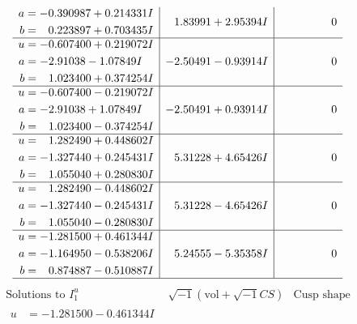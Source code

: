 \documentclass[1p]{elsarticle_modified}
\theoremstyle{definition}
\newcommand{\I}{\sqrt{-1}}
\begin{document}
$$\begin{array}{c|c|c}
\begin{aligned}
a &= -0.390987 + 0.214331 I \\
b &= \phantom{-}0.223897 + 0.703435 I\end{aligned}
 & \phantom{-}1.83991 + 2.95394 I & \phantom{-0.000000 } 0 \\ \hline\begin{aligned}
u &= -0.607400 + 0.219072 I \\
a &= -2.91038 - 1.07849 I \\
b &= \phantom{-}1.023400 + 0.374254 I\end{aligned}
 & -2.50491 - 0.93914 I & \phantom{-0.000000 } 0 \\ \hline\begin{aligned}
u &= -0.607400 - 0.219072 I \\
a &= -2.91038 + 1.07849 I \\
b &= \phantom{-}1.023400 - 0.374254 I\end{aligned}
 & -2.50491 + 0.93914 I & \phantom{-0.000000 } 0 \\ \hline\begin{aligned}
u &= \phantom{-}1.282490 + 0.448602 I \\
a &= -1.327440 + 0.245431 I \\
b &= \phantom{-}1.055040 + 0.280830 I\end{aligned}
 & \phantom{-}5.31228 + 4.65426 I & \phantom{-0.000000 } 0 \\ \hline\begin{aligned}
u &= \phantom{-}1.282490 - 0.448602 I \\
a &= -1.327440 - 0.245431 I \\
b &= \phantom{-}1.055040 - 0.280830 I\end{aligned}
 & \phantom{-}5.31228 - 4.65426 I & \phantom{-0.000000 } 0 \\ \hline\begin{aligned}
u &= -1.281500 + 0.461344 I \\
a &= -1.164950 - 0.538206 I \\
b &= \phantom{-}0.874887 - 0.510887 I\end{aligned}
 & \phantom{-}5.24555 - 5.35358 I & \phantom{-0.000000 } 0\\
 \hline 
 \end{array}$$\newpage$$\begin{array}{c|c|c}  
\text{Solutions to }I^u_{1}& \I (\text{vol} + \sqrt{-1}CS) & \text{Cusp shape}\\
 \hline 
\begin{aligned}
u &= -1.281500 - 0.461344 I \\

\end{aligned}
\end{array}$$
\end{document}

